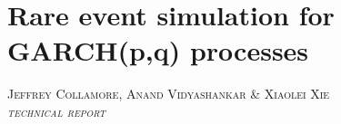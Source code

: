 \chapter[Rare event simulation for GARCH(p,q) processes]
        {{\huge Rare event simulation for GARCH(p,q) processes}}
\label{ch:ImportanceSampling}

\begin{center}
\textsc{Jeffrey Collamore, Anand Vidyashankar \& Xiaolei Xie\\
{\em technical report}}
\end{center}


